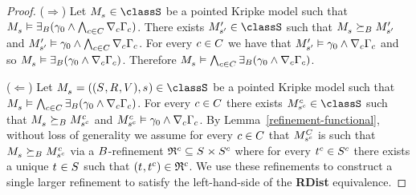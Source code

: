 \begin{proof}
($\Rightarrow$)
Let $\kPModel{\kStateS} \in \classS$ be a pointed Kripke model such that $\kPModel{\kStateS} \entails \somerefsBs (\gamma_0 \land \bigwedge_{\agentC \in \agentsC} \coversC \Gamma_\agentC)$.
There exists $\kPModelP{\kStateSP} \in \classS$ such that $\kPModel{\kStateS} \simulatesBs \kPModelP{\kStateSP}$ and $\kPModelP{\kStateSP} \entails \gamma_0 \land \bigwedge_{\agentC \in \agentsC} \coversC \Gamma_\agentC$.
For every $\agentC \in \agentsC$ we have that $\kPModelP{\kStateSP} \entails \gamma_0 \land \coversC \Gamma_\agentC$ and so $\kPModel{\kStateS} \entails \somerefsBs (\gamma_0 \land \coversC \Gamma_\agentC)$.
Therefore $\kPModel{\kStateS} \entails \bigwedge_{\agentC \in \agentsC} \somerefsBs (\gamma_0 \land \coversC \Gamma_\agentC)$.

($\Leftarrow$)
Let $\kPModelAndTuple{\kStateS} \in \classS$ be a pointed Kripke model such that $\kPModel{\kStateS} \entails \bigwedge_{\agentC \in \agentsC} \somerefsBs (\gamma_0 \land \coversC \Gamma_\agentC)$.
For every $\agentC \in \agentsC$ there exists $\kPModel[\agentC]{\kStateS[\agentC]} \in \classS$ such that $\kPModel{\kStateS} \simulatesBs \kPModel[\agentC]{\kStateS[\agentC]}$ and $\kPModel[\agentC]{\kStateS[\agentC]} \entails \gamma_0 \land \coversC \Gamma_\agentC$.
By Lemma~\ref{refinement-functional}, without loss of generality we assume for every $\agentC \in \agentsC$ that $\kPModel[\agentsC]{\kStateS[\agentC]}$ is such that $\kPModel{\kStateS} \simulatesBs \kPModel[\agentC]{\kStateS[\agentC]}$ via a $\agentsB$-refinement $\refinement^{\agentC} \subseteq \kStates \times \kStates[\agentC]$ where for every $\kStateT[\agentC] \in \kStates[\agentC]$ there exists a unique $\kStateT \in \kStates$ such that $(\kStateT, \kStateT[\agentC]) \in \refinement^{\agentC}$.
We use these refinements to construct a single larger refinement to satisfy the left-hand-side of the {\bf RDist} equivalence.


\end{proof}
